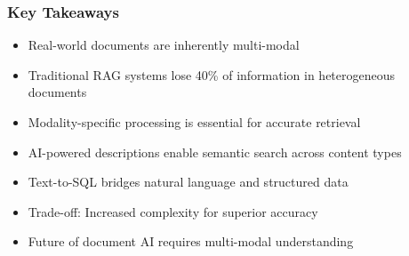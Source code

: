 \begin{frame}[fragile]\frametitle{Key Takeaways}
\begin{itemize}
\item Real-world documents are inherently multi-modal
\item Traditional RAG systems lose 40\% of information in heterogeneous documents
\item Modality-specific processing is essential for accurate retrieval
\item AI-powered descriptions enable semantic search across content types
\item Text-to-SQL bridges natural language and structured data
\item Trade-off: Increased complexity for superior accuracy
\item Future of document AI requires multi-modal understanding
\end{itemize}
\end{frame}